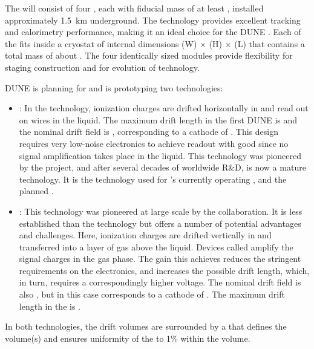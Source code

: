 The \fdfiducialmass {}  will consist of four  , each with fiducial mass of at least \nominalmodsize, installed approximately \SI{1.5}{km} underground. The  technology provides
excellent tracking and calorimetry performance, making it an ideal
choice for the DUNE . Each of the  fits inside a cryostat of internal dimensions
\cryostatwdth (W) $\times$ \cryostatht (H) $\times$ \cryostatlen (L) that contains a total \lar{} mass of about \larmass{}.
 The four identically sized modules provide flexibility for staging construction and for evolution of  technology.

DUNE is planning for and is prototyping two  technologies:
\begin{itemize}
\item {}: In the  technology, ionization charges are drifted horizontally in  and read out on wires in the liquid.  The maximum drift length in the first DUNE  is \spmaxdrift and the nominal drift field is \spmaxfield, corresponding to a cathode  of \sptargetdriftvoltpos. This design requires very low-noise electronics to achieve readout with good  since no signal amplification takes place in the liquid. This technology was pioneered by the  project, and after several decades of worldwide R\&D, is now a mature technology. It is the technology used for 's currently operating , and the planned . 

\item {}: This technology was pioneered at large scale by the  collaboration. It is less established than the  technology but offers a number of potential advantages and challenges. Here, ionization charges are drifted vertically in  and transferred into a layer of gas above the liquid. Devices called  amplify the signal charges  in the gas phase. The gain this achieves reduces the stringent requirements on the electronics, and increases the possible drift length, which, in turn, requires a correspondingly higher voltage. The nominal drift field is also \dpnominaldriftfield, but in this case corresponds to a cathode  of \dptargetdriftvoltpos.
The maximum drift length in the  is \dpmaxdrift{}.  
\end{itemize}
In both technologies, the drift volumes are surrounded by a  that defines the volume(s) and ensures uniformity of the \efield to 1\% within the volume.

